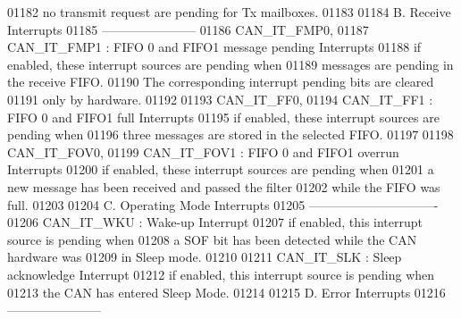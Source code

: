 \begin{DoxyCode}
01182 \textcolor{comment}{                          no transmit request are pending for Tx mailboxes.      }
01183 \textcolor{comment}{}
01184 \textcolor{comment}{   B. Receive Interrupts}
01185 \textcolor{comment}{  -----------------------          }
01186 \textcolor{comment}{        CAN\_IT\_FMP0,}
01187 \textcolor{comment}{        CAN\_IT\_FMP1    :  FIFO 0 and FIFO1 message pending Interrupts}
01188 \textcolor{comment}{                          if enabled, these interrupt sources are pending when }
01189 \textcolor{comment}{                          messages are pending in the receive FIFO.}
01190 \textcolor{comment}{                          The corresponding interrupt pending bits are cleared }
01191 \textcolor{comment}{                          only by hardware.}
01192 \textcolor{comment}{                }
01193 \textcolor{comment}{        CAN\_IT\_FF0,              }
01194 \textcolor{comment}{        CAN\_IT\_FF1     :  FIFO 0 and FIFO1 full Interrupts}
01195 \textcolor{comment}{                          if enabled, these interrupt sources are pending when}
01196 \textcolor{comment}{                          three messages are stored in the selected FIFO.}
01197 \textcolor{comment}{        }
01198 \textcolor{comment}{        CAN\_IT\_FOV0,        }
01199 \textcolor{comment}{        CAN\_IT\_FOV1    :  FIFO 0 and FIFO1 overrun Interrupts        }
01200 \textcolor{comment}{                          if enabled, these interrupt sources are pending when}
01201 \textcolor{comment}{                          a new message has been received and passed the filter}
01202 \textcolor{comment}{                          while the FIFO was full.}
01203 \textcolor{comment}{}
01204 \textcolor{comment}{   C. Operating Mode Interrupts}
01205 \textcolor{comment}{  -------------------------------          }
01206 \textcolor{comment}{        CAN\_IT\_WKU     :  Wake-up Interrupt}
01207 \textcolor{comment}{                          if enabled, this interrupt source is pending when }
01208 \textcolor{comment}{                          a SOF bit has been detected while the CAN hardware was }
01209 \textcolor{comment}{                          in Sleep mode.}
01210 \textcolor{comment}{                                  }
01211 \textcolor{comment}{        CAN\_IT\_SLK     :  Sleep acknowledge Interrupt}
01212 \textcolor{comment}{                          if enabled, this interrupt source is pending when }
01213 \textcolor{comment}{                          the CAN has entered Sleep Mode.       }
01214 \textcolor{comment}{}
01215 \textcolor{comment}{   D. Error Interrupts }
01216 \textcolor{comment}{  -----------------------         }

\end{DoxyCode}
